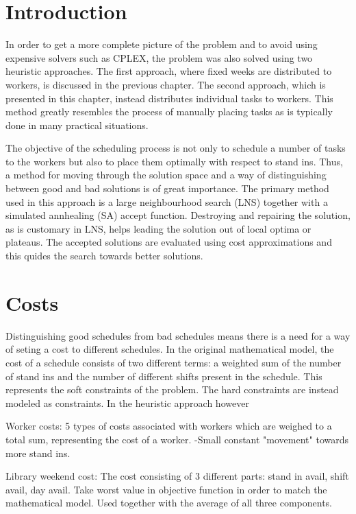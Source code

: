 
\section{Introduction}

In order to get a more complete picture of the problem and to avoid using expensive solvers such as CPLEX, the problem was also solved using two heuristic approaches. The first approach, where fixed weeks are distributed to workers, is discussed in the previous chapter. The second approach, which is presented in this chapter, instead distributes individual tasks to workers. This method greatly resembles the process of manually placing tasks as is typically done in many practical situations. 

The objective of the scheduling process is not only to schedule a number of tasks to the workers but also to place them optimally with respect to stand ins. Thus, a method for moving through the solution space and a way of distinguishing between good and bad solutions is of great importance. The primary method used in this approach is a large neighbourhood search (LNS) together with a simulated annhealing (SA) accept function. Destroying and repairing the solution, as is customary in LNS, helps leading the solution out of local optima or plateaus. The accepted solutions are evaluated using cost approximations and this quides the search towards better solutions.

\section{Costs}
Distinguishing good schedules from bad schedules means there is a need for a way of seting a cost to different schedules. In the original mathematical model, the cost of a schedule consists of two different terms: a weighted sum of the number of stand ins and the number of different shifts present in the schedule. This represents the soft constraints of the problem. The hard constraints are instead modeled as constraints. In the heuristic approach however

Worker costs: 5 types of costs associated with workers which are weighed to a total sum, representing the cost of a worker. -Small constant "movement" towards more stand ins.

Library weekend cost: The cost consisting of 3 different parts: stand in avail, shift avail, day avail. Take worst value in objective function in order to match the mathematical model. Used together with the average of all three components. 

